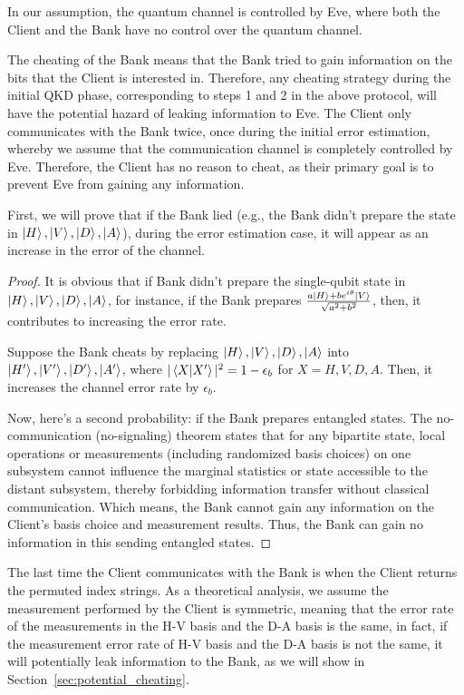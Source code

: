 \documentclass[%
 reprint,
superscriptaddress,
 amsmath,amssymb,
 aps,
]{revtex4-2}
\begin{document}
In our assumption, the quantum channel is controlled by Eve, where both the Client and the Bank have no control over the quantum channel.

The cheating of the Bank means that the Bank tried to gain information on the bits that the Client is interested in. Therefore, any cheating strategy during the initial QKD phase, corresponding to steps 1 and 2 in the above protocol, will have the potential hazard of leaking information to Eve. The Client only communicates with the Bank twice, once during the initial error estimation, whereby we assume that the communication channel is completely controlled by Eve. Therefore, the Client has no reason to cheat, as their primary goal is to prevent Eve from gaining any information.

First, we will prove that if the Bank lied (e.g., the Bank didn't prepare the state in $\ket{H}, \ket{V}, \ket{D}, \ket{A}$), during the error estimation case, it will appear as an increase in the error of the channel.

\begin{proof}
    It is obvious that if Bank didn't prepare the single-qubit state in $\ket{H}, \ket{V}, \ket{D}, \ket{A}$, for instance, if the Bank prepares $\frac{a\ket{H}+be^{i\theta}\ket{V}}{\sqrt{a^2+b^2}}$, then, it contributes to increasing the error rate.

    Suppose the Bank cheats by replacing $\ket{H}, \ket{V}, \ket{D}, \ket{A}$ into $\ket{H'}, \ket{V'}, \ket{D'}, \ket{A'}$, where $|\bra{X}\ket{X'}|^2=1-\epsilon_b$ for $X=H, V, D, A$. Then, it increases the channel error rate by $\epsilon_b$.

    Now, here's a second probability: if the Bank prepares entangled states. The no-communication (no-signaling) theorem states that for any bipartite state, local operations or measurements (including randomized basis choices) on one subsystem cannot influence the marginal statistics or state accessible to the distant subsystem, thereby forbidding information transfer without classical communication. Which means, the Bank cannot gain any information on the Client's basis choice and measurement results. Thus, the Bank can gain no information in this sending entangled states. 

\end{proof}

The last time the Client communicates with the Bank is when the Client returns the permuted index strings. As a theoretical analysis, we assume the measurement performed by the Client is symmetric, meaning that the error rate of the measurements in the H-V basis and the D-A basis is the same, in fact, if the measurement error rate of H-V basis and the D-A basis is not the same, it will potentially leak information to the Bank, as we will show in Section~\ref{sec:potential_cheating}.
\end{document}
